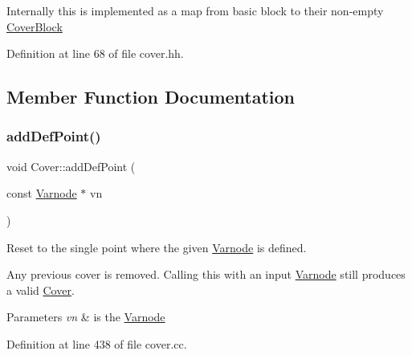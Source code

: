 Internally this is implemented as a map from basic block to their non-\/empty \mbox{\hyperlink{class_cover_block}{Cover\+Block}} 

Definition at line 68 of file cover.\+hh.



\subsection{Member Function Documentation}
\mbox{\label{class_cover_a462cc65e034e09963b612d1d3b1faa31}} 
\subsubsection{\texorpdfstring{addDefPoint()}{addDefPoint()}}
{\footnotesize\ttfamily void Cover\+::add\+Def\+Point (\begin{DoxyParamCaption}\item[{const \mbox{\hyperlink{class_varnode}{Varnode}} $\ast$}]{vn }\end{DoxyParamCaption})}



Reset to the single point where the given \mbox{\hyperlink{class_varnode}{Varnode}} is defined. 

Any previous cover is removed. Calling this with an input \mbox{\hyperlink{class_varnode}{Varnode}} still produces a valid \mbox{\hyperlink{class_cover}{Cover}}. 
\begin{DoxyParams}{Parameters}
{\em vn} & is the \mbox{\hyperlink{class_varnode}{Varnode}} \\
\hline
\end{DoxyParams}


Definition at line 438 of file cover.\+cc.

